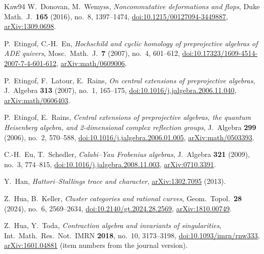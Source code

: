 \documentclass[11pt]{amsart}
\numberwithin{table}{section}
\numberwithin{figure}{section}
\numberwithin{equation}{section}
\theoremstyle{definition}
\theoremstyle{plain}
\begin{document}
\begin{thebibliography}{Kaw94}
W.~Donovan, M.~Wemyss, \emph{Noncommutative deformations and flops}, Duke Math.\ J.\ \textbf{165} (2016), no.~8, 1397--1474, \href{https://doi.org/10.1215/00127094-3449887}{doi:10.1215/00127094-3449887}, \href{https://arxiv.org/abs/1309.0698}{arXiv:1309.0698}.

P.~Etingof, C.-H.~Eu, \emph{Hochschild and cyclic homology of preprojective algebras of ADE quivers}, Mosc.\ Math.\ J.\ \textbf{7} (2007), no.~4, 601--612, \href{https://doi.org/10.17323/1609-4514-2007-7-4-601-612}{doi:10.17323/1609-4514-2007-7-4-601-612}, \href{https://arxiv.org/abs/math/0609006}{arXiv:math/0609006}.

P.~Etingof, F.~Latour, E.~Rains, \emph{On central extensions of preprojective algebras}, J.\ Algebra \textbf{313} (2007), no.~1, 165--175, \href{https://doi.org/10.1016/j.jalgebra.2006.11.040}{doi:10.1016/j.jalgebra.2006.11.040}, \href{https://arxiv.org/abs/math/0606403}{arXiv:math/0606403}.

P.~Etingof, E.~Rains, \emph{Central extensions of preprojective algebras, the quantum Heisenberg algebra, and 2-dimensional complex reflection groups}, J.\ Algebra \textbf{299} (2006), no.~2, 570--588, \href{https://doi.org/10.1016/j.jalgebra.2006.01.005}{doi:10.1016/j.jalgebra.2006.01.005}, \href{https://arxiv.org/abs/math/0503393}{arXiv:math/0503393}.

C.-H.~Eu, T.~Schedler, \emph{Calabi--Yau Frobenius algebras}, J.\ Algebra \textbf{321} (2009), no.~3, 774--815, \href{https://doi.org/10.1016/j.jalgebra.2008.11.003}{doi:10.1016/j.jalgebra.2008.11.003}, \href{https://arxiv.org/abs/0710.3391}{arXiv:0710.3391}.

Y.~Han, \emph{Hattori--Stallings trace and character}, \href{https://arxiv.org/abs/1302.7095}{arXiv:1302.7095} (2013).

Z.~Hua, B.~Keller, \emph{Cluster categories and rational curves}, Geom.\ Topol.\ \textbf{28} (2024), no.~6, 2569--2634, \href{https://doi.org/10.2140/gt.2024.28.2569}{doi:10.2140/gt.2024.28.2569}, \href{https://arxiv.org/abs/1810.00749}{arXiv:1810.00749}.

Z.~Hua, Y.~Toda, \emph{Contraction algebra and invariants of singularities}, Int.\ Math.\ Res.\ Not.\ IMRN \textbf{2018}, no.~10, 3173--3198, \href{https://doi.org/10.1093/imrn/rnw333}{doi:10.1093/imrn/rnw333}, \href{https://arxiv.org/abs/1601.04881}{arXiv:1601.04881} (item numbers from the journal version).


\end{thebibliography}
\end{document}

